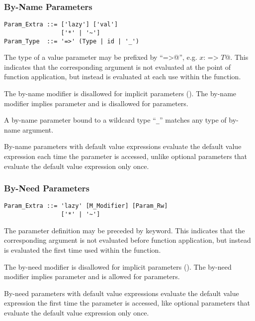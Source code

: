 \subsubsection{By-Name Parameters}
\label{sec:by-name-parameters}

\syntax\begin{lstlisting}
Param_Extra ::= ['lazy'] ['val']
                ['*' | '~']
Param_Type  ::= '=>' (Type | id | '_')
\end{lstlisting}

The type of a value parameter may be prefixed by ``\lstinline@=>@'', e.g. \lstinline@$x$: => $T$@. This indicates that the corresponding argument is not evaluated at the point of function application, but instead is evaluated at each use within the function.

The by-name modifier is disallowed for implicit parameters (). The by-name modifier implies  parameter and is disallowed for  parameters. 

A by-name parameter bound to a wildcard type ``\lstinline!_!'' matches any type of by-name argument. 

By-name parameters with default value expressions evaluate the default value expression each time the parameter is accessed, unlike optional parameters that evaluate the default value expression only once. 






\subsubsection{By-Need Parameters}
\label{sec:by-need-parameters}

\syntax\begin{lstlisting}
Param_Extra ::= 'lazy' [M_Modifier] [Param_Rw]
                ['*' | '~']
\end{lstlisting}

The parameter definition may be preceded by  keyword. This indicates that the corresponding argument is not evaluated before function application, but instead is evaluated the first time used within the function. 

The by-need modifier is disallowed for implicit parameters (). The by-need modifier implies  parameter and is allowed for  parameters. 

By-need parameters with default value expressions evaluate the default value expression the first time the parameter is accessed, like optional parameters that evaluate the default value expression only once. 

